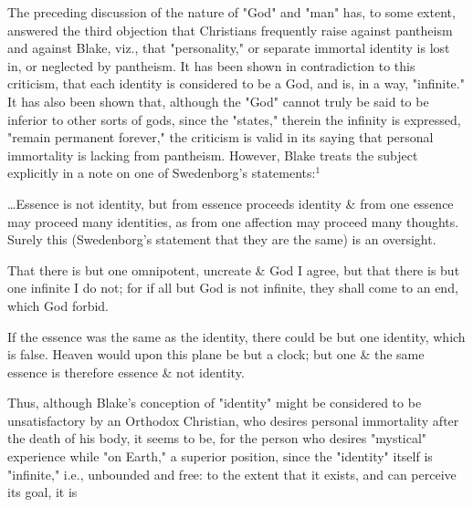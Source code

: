 The preceding discussion of the nature of "God" and "man" has, to some extent, answered the third objection that
Christians frequently raise against pantheism and against Blake, viz., that "personality," or separate immortal identity
is lost in, or neglected by pantheism. It has been shown in contradiction to this criticism, that each identity is
considered to be a God, and is, in a way, "infinite." It has also been shown that, although the "God" cannot truly be
said to be inferior to other sorts of gods, since the "states," therein the infinity is expressed, "remain permanent forever,"
the criticism is valid in its saying that personal immortality is lacking from pantheism. However, Blake treats the subject
explicitly in a note on one of Swedenborg's statements:$^{1}$\par
\begin{center}
	\parbox{0.8\textwidth}{
		\hspace*{5mm}\dots Essence is not identity, but from essence proceeds identity \& from
		one essence may proceed many identities, as from one affection may proceed many thoughts.
		Surely this (Swedenborg's statement that they are the same) is an oversight.\par
	}%
\end{center}
\begin{center}
	\parbox{0.8\textwidth}{
		\hspace*{5mm}That there is but one omnipotent, uncreate \& God I agree, but
		that there is but one infinite I do not; for if all but God is not infinite, they shall
		come to an end, which God forbid.\par
	}%
\end{center}
\begin{center}
	\parbox{0.8\textwidth}{
		\hspace*{5mm}If the essence was the same as the identity, there could be but one identity, which
		is false. Heaven would upon this plane be but a clock; but one \& the same
		essence is therefore essence \& not identity.\par
	}%
\end{center}
\hspace*{5mm}Thus, although Blake's conception of "identity" might be considered to be unsatisfactory
by an Orthodox Christian, who desires personal immortality after the death of his body, it seems to be, for
the person who desires "mystical" experience while "on Earth," a superior position, since the "identity" itself
is "infinite," i.e., unbounded and free: to the extent that it exists, and can perceive its goal, it is

